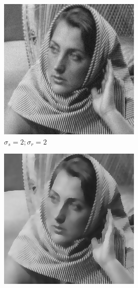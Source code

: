 \documentclass[12pt]{article}
\begin{document}
\begin{figure}[h]
\begin{subfigure}[b]{0.24\textwidth}
        \includegraphics[width=\textwidth]{../images/filtered_barbara256_meanshift_sigma_s_2_sigma_r_2.png}
        \caption{$\sigma_s=2;\sigma_r=2$}
        \label{fig:subfig2}
    \end{subfigure}
    \begin{subfigure}[b]{0.24\textwidth}
        \centering
        \includegraphics[width=\textwidth]{../images/filtered_barbara256_meanshift_sigma_s_3_sigma_r_15.png}

\end{subfigure}
\end{figure}
\end{document}
